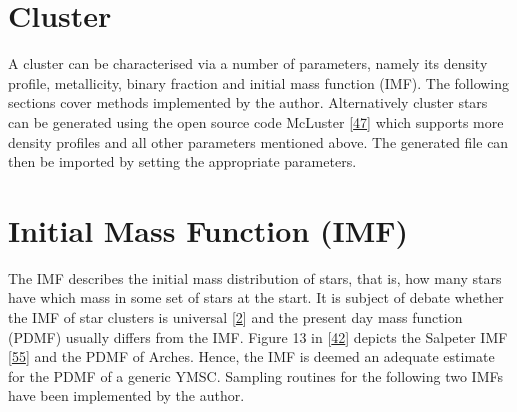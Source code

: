 \documentclass[letterpaper,10pt,english]{sphinxmanual}
\begin{document}
\section{Cluster}
\label{\detokenize{NBodySimulation/Initialization:cluster}}
\sphinxAtStartPar
A cluster can be characterised via a number of parameters, namely its density profile, metallicity, binary fraction and initial mass function (IMF).
The following sections cover methods implemented by the author. Alternatively cluster stars can be generated using the open source code McLuster {[}\hyperlink{cite.NBodySimulation/Appendix:id35}{47}{]} which supports more density profiles and all other parameters mentioned above.
The generated file can then be imported by setting the appropriate parameters.


\section{Initial Mass Function (IMF)}
\label{\detokenize{NBodySimulation/Initialization:initial-mass-function-imf}}
\sphinxAtStartPar
The IMF describes the initial mass distribution of stars, that is, how many stars have which mass in some set of stars at the start.
It is subject of debate whether the IMF of star clusters is universal {[}\hyperlink{cite.NBodySimulation/Appendix:id45}{2}{]} and the present day mass function (PDMF) usually differs from the IMF.
Figure 13 in {[}\hyperlink{cite.NBodySimulation/Appendix:id44}{42}{]} depicts the Salpeter IMF {[}\hyperlink{cite.NBodySimulation/Appendix:id49}{55}{]} and the PDMF of Arches. Hence, the IMF is deemed an adequate estimate for the PDMF of a generic YMSC.
Sampling routines for the following two IMFs have been implemented by the author.
\end{document}
